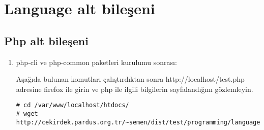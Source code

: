 \documentclass[a4paper,10pt]{article}
\begin{document}
\section{Language alt bileşeni}
\subsection{Php alt bileşeni}
\begin{enumerate}
 \item php-cli ve php-common paketleri kurulumu sonrası:

Aşağıda bulunan komutları çalıştırdıktan sonra http://localhost/test.php adresine firefox ile girin ve php ile ilgili bilgilerin sayfalandığını gözlemleyin.

\begin{verbatim}
# cd /var/www/localhost/htdocs/
# wget http://cekirdek.pardus.org.tr/~semen/dist/test/programming/language/php/test.php 
\end{verbatim}

\end{enumerate}
\end{document}
